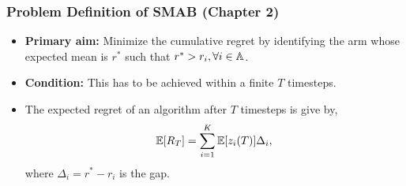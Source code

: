 \begin{frame}
\frametitle{Problem Definition of SMAB ({Chapter 2})}
\begin{itemize}
\item<1-> \textbf{Primary aim:} Minimize the cumulative regret by identifying the arm whose expected mean is $r^*$ such that $r^* > r_i,\forall i\in\mathbb{A}$.
\item<2-> \textbf{Condition:} This has to be achieved within a finite $T$ timesteps.
\item<3-> The expected regret of an algorithm after $T$ timesteps is give by,
\begin{align*}
\mathbb{E}[R_{T}]= \sum_{i=1}^{K} \mathbb{E}[z_i (T)] \Delta_i,
\end{align*}
where $\Delta_{i}=r^{*}-r_{i}$ is the gap.
\end{itemize}
\end{frame}

%
%

